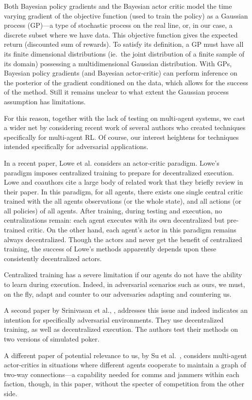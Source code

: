 \documentclass{article}
\begin{document}
Both Bayesian policy gradients and the Bayesian actor critic model the
time varying gradient of the objective function (used to train the
policy) as a Gaussian process (GP)---a type of stochastic process on
the real line, or, in our case, a discrete subset where we have data.
This objective function gives the expected return (discounted sum of
rewards).  To satisfy its definition, a GP must have all its finite
dimensional distributions (ie.\ the joint distribution of a finite
sample of its domain) possessing a multidimensional Gaussian
distribution. With GPs, Bayesian policy gradients (and Bayesian
actor-critic) can perform inference on the posterior of the gradient
conditioned on the data, which allows for the success of the method.
Still it remains unclear to what extent the Gaussian process
assumption has limitations.

For this reason, together with the lack of testing on multi-agent
systems, we cast a wider net by considering recent work of several
authors who created techniques specifically for multi-agent RL.  Of
course, our interest heightens for techniques intended specifically
for adversarial applications.

In a recent paper, Lowe et al. \cite{lowe2017multi} considers an
actor-critic paradigm.  Lowe's paradigm imposes centralized training
to prepare for decentralized execution.  Lowe and coauthors cite a
large body of related work that they briefly review in their paper.
In this paradigm, for all agents, there exists one single central
critic trained with the all agents observations (or the whole state),
and all actions (or all policies) of all agents.  After training,
during testing and execution, no centralizations remain: each agent
executes with its own decentralized but pre-trained critic.  On the
other hand, each agent's actor in this paradigm remains always
decentralized.  Though the actors and never get the benefit of
centralized training, the success of Lowe's methods apparently depends
upon these consistently decentralized actors.

Centralized training has a severe limitation if our agents do not have
the ability to learn during execution.  Indeed, in adversarial
scenarios such as ours, we must, on the fly, adapt and counter to our
adversaries adapting and countering us.

A second paper by Srinivasan et al., \cite{srinivasan2018actor},
addresses this issue and indeed indicates an intention for
specifically adversarial environments.  They use decentralized
training, as well as decentralized execution.  The authors test their
methods on two versions of simulated poker.

A different paper of potential relevance to us, by Su et al.\
\cite{su2020counterfactual}, considers multi-agent actor-critics in
situations where different agents cooperate to maintain a graph of
two-way connections---a capability needed for comms and jammers within
each faction, though, in this paper, without the specter of
competition from the other side.


% 

\end{document}
